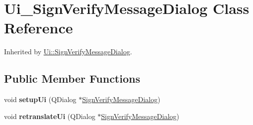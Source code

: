 \hypertarget{class_ui___sign_verify_message_dialog}{}\section{Ui\+\_\+\+Sign\+Verify\+Message\+Dialog Class Reference}
\label{class_ui___sign_verify_message_dialog}


Inherited by \mbox{\hyperlink{class_ui_1_1_sign_verify_message_dialog}{Ui\+::\+Sign\+Verify\+Message\+Dialog}}.

\subsection*{Public Member Functions}
\begin{DoxyCompactItemize}
\item 
\mbox{\label{class_ui___sign_verify_message_dialog_ab2c5ab3f80600be42656f693b73e75b0}} 
void {\bfseries setup\+Ui} (Q\+Dialog $\ast$\mbox{\hyperlink{class_sign_verify_message_dialog}{Sign\+Verify\+Message\+Dialog}})
\item 
\mbox{\label{class_ui___sign_verify_message_dialog_ad1b90e652bb25a7838e1faf591c3b779}} 
void {\bfseries retranslate\+Ui} (Q\+Dialog $\ast$\mbox{\hyperlink{class_sign_verify_message_dialog}{Sign\+Verify\+Message\+Dialog}})
\end{DoxyCompactItemize}
